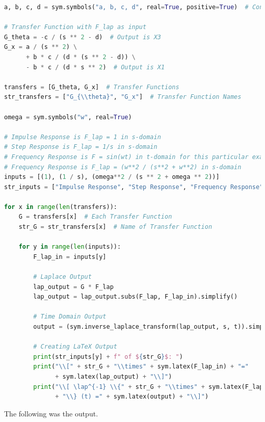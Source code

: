 \documentclass[a4paper,10pt,reqno]{article}
\newcommand{\lap}{\mathscr{L}}
\numberwithin{equation}{section}
\begin{document}
\begin{lstlisting}[language=Python]
a, b, c, d = sym.symbols("a, b, c, d", real=True, positive=True)  # Constants

# Transfer Function with F_lap as input
G_theta = -c / (s ** 2 - d)  # Output is X3
G_x = a / (s ** 2) \
      + b * c / (d * (s ** 2 - d)) \
      - b * c / (d * s ** 2)  # Output is X1

transfers = [G_theta, G_x]  # Transfer Functions
str_transfers = ["G_{\\theta}", "G_x"]  # Transfer Function Names

omega = sym.symbols("w", real=True)

# Impulse Response is F_lap = 1 in s-domain
# Step Response is F_lap = 1/s in s-domain
# Frequency Response is F = sin(wt) in t-domain for this particular example
# Frequency Response is F_lap = (w**2 / (s**2 + w**2) in s-domain
inputs = [(1), (1 / s), (omega**2 / (s ** 2 + omega ** 2))]
str_inputs = ["Impulse Response", "Step Response", "Frequency Response"]

for x in range(len(transfers)):
    G = transfers[x]  # Each Transfer Function
    str_G = str_transfers[x]  # Name of Transfer Function

    for y in range(len(inputs)):
        F_lap_in = inputs[y]

        # Laplace Output
        lap_output = G * F_lap
        lap_output = lap_output.subs(F_lap, F_lap_in).simplify()

        # Time Domain Output
        output = (sym.inverse_laplace_transform(lap_output, s, t)).simplify()

        # Creating LaTeX Output
        print(str_inputs[y] + f" of ${str_G}$: ")
        print("\\[" + str_G + "\\times" + sym.latex(F_lap_in) + "=" 
              + sym.latex(lap_output) + "\\]")
        print("\\[ \lap^{-1} \\{" + str_G + "\\times" + sym.latex(F_lap_in)
              + "\\} (t) =" + sym.latex(output) + "\\]")
\end{lstlisting}

\noindent
The following was the output.
\end{document}
